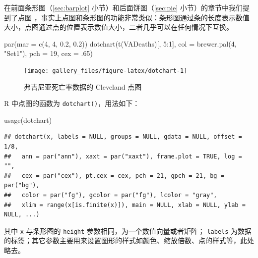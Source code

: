 \documentclass[
  b5paper,
  UTF8,twoside]{book}
\newenvironment{Shaded}{\begin{snugshade}}{\end{snugshade}}
\newcommand{\AttributeTok}[1]{\textcolor[rgb]{0.77,0.63,0.00}{#1}}
\newcommand{\DecValTok}[1]{\textcolor[rgb]{0.00,0.00,0.81}{#1}}
\newcommand{\FloatTok}[1]{\textcolor[rgb]{0.00,0.00,0.81}{#1}}
\newcommand{\FunctionTok}[1]{\textcolor[rgb]{0.00,0.00,0.00}{#1}}
\newcommand{\NormalTok}[1]{#1}
\newcommand{\SpecialCharTok}[1]{\textcolor[rgb]{0.00,0.00,0.00}{#1}}
\newcommand{\StringTok}[1]{\textcolor[rgb]{0.31,0.60,0.02}{#1}}
\begin{document}
在前面条形图（\ref{sec:barplot} 小节）和后面饼图（\ref{sec:pie} 小节）的章节中我们提到了点图 \citep{Cleveland85}，事实上点图和条形图的功能非常类似：条形图通过条的长度表示数值大小，点图通过点的位置表示数值大小，二者几乎可以在任何情况下互换。





\begin{Shaded}
\begin{Highlighting}[]
\FunctionTok{par}\NormalTok{(}\AttributeTok{mar =} \FunctionTok{c}\NormalTok{(}\DecValTok{4}\NormalTok{, }\DecValTok{4}\NormalTok{, }\FloatTok{0.2}\NormalTok{, }\FloatTok{0.2}\NormalTok{))}
\FunctionTok{dotchart}\NormalTok{(}\FunctionTok{t}\NormalTok{(VADeaths)[, }\DecValTok{5}\SpecialCharTok{:}\DecValTok{1}\NormalTok{], }\AttributeTok{col =} \FunctionTok{brewer.pal}\NormalTok{(}\DecValTok{4}\NormalTok{, }\StringTok{"Set1"}\NormalTok{), }\AttributeTok{pch =} \DecValTok{19}\NormalTok{, }\AttributeTok{cex =}\NormalTok{ .}\DecValTok{65}\NormalTok{)}
\end{Highlighting}
\end{Shaded}

\begin{figure}

{\centering \texttt{[image: gallery\_files/figure-latex/dotchart-1]} 

}

\caption[弗吉尼亚死亡率数据的 Cleveland 点图]{弗吉尼亚死亡率数据的 Cleveland 点图}\label{fig:dotchart}
\end{figure}

R 中点图的函数为 \texttt{dotchart()}，用法如下：

\begin{Shaded}
\begin{Highlighting}[]
\FunctionTok{usage}\NormalTok{(dotchart)}
\end{Highlighting}
\end{Shaded}

\begin{verbatim}
## dotchart(x, labels = NULL, groups = NULL, gdata = NULL, offset = 1/8,
##   ann = par("ann"), xaxt = par("xaxt"), frame.plot = TRUE, log = "",
##   cex = par("cex"), pt.cex = cex, pch = 21, gpch = 21, bg = par("bg"),
##   color = par("fg"), gcolor = par("fg"), lcolor = "gray",
##   xlim = range(x[is.finite(x)]), main = NULL, xlab = NULL, ylab = NULL, ...)
\end{verbatim}

其中 \texttt{x} 与条形图的 \texttt{height} 参数相同，为一个数值向量或者矩阵； \texttt{labels} 为数据的标签；其它参数主要用来设置图形的样式如颜色、缩放倍数、点的样式等，此处略去。
\end{document}
